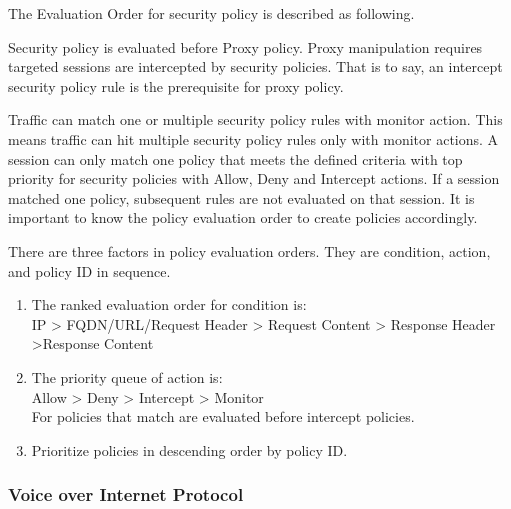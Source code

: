 The Evaluation Order for security policy is described as following. 


Security policy is evaluated before Proxy policy. Proxy manipulation requires targeted sessions are intercepted by security policies. 
That is to say, an intercept security policy rule is the prerequisite for proxy policy. 


Traffic can match one or multiple security policy rules with monitor action. This means traffic can hit multiple security policy rules only with monitor actions. 
A session can only match one policy that meets the defined criteria with top priority for security policies with Allow, Deny and Intercept actions. 
If a session matched one policy, subsequent rules are not evaluated on that session. It is important to know the policy evaluation order to create policies accordingly. 


There are three factors in policy evaluation orders. They are condition, action, and policy ID in sequence.


\begin{description}[leftmargin=0pt,itemindent=0em,itemsep=0.5ex]
    \item
    \begin{enumerate}
        \setlength{\topsep}{0pt} %
        \item The ranked evaluation order for condition is:\\
        IP > FQDN/URL/Request Header > Request Content > Response Header >Response Content
        \item The priority queue of action is:\\
        Allow > Deny > Intercept > Monitor\\
        For policies that match \hyperlink{link:SSL Decryption Exclusion}{\color{linkblue}{SSL Decryption Exclusion}} are evaluated before intercept policies.
        \item Prioritize policies in descending order by policy ID. 
    \end{enumerate}
\end{description}


\subsubsection*{\hypertarget{link:Voice over Internet Protocol}{Voice over Internet Protocol}}
\label{sec:policies:security:filter:voip}

